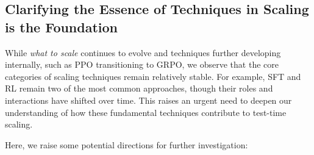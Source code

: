 \subsection{Clarifying the Essence of Techniques in Scaling is the Foundation}
\label{subsec:foundation}
While \textit{what to scale} continues to evolve and techniques further developing internally, such as PPO transitioning to GRPO, we observe that the core categories of scaling techniques remain relatively stable. For example, SFT and RL remain two of the most common approaches, though their roles and interactions have shifted over time. This raises an urgent need to deepen our understanding of how these fundamental techniques contribute to test-time scaling. 

Here, we raise some potential directions for further investigation:
